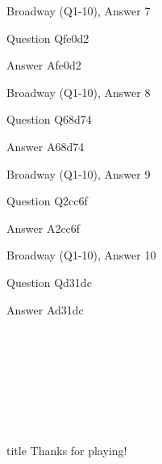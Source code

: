 \documentclass[11pt]{beamer}
\begin{document}
\begin{frame}[t]{Broadway (Q1-10), Answer 7}
\vspace{2em}
\begin{block}{Question}
Qfe0d2
\end{block}
\pause{}
\begin{block}{Answer}
Afe0d2
\end{block}
\end{frame}
    

\begin{frame}[t]{Broadway (Q1-10), Answer 8}
\vspace{2em}
\begin{block}{Question}
Q68d74
\end{block}
\pause{}
\begin{block}{Answer}
A68d74
\end{block}
\end{frame}
    

\begin{frame}[t]{Broadway (Q1-10), Answer 9}
\vspace{2em}
\begin{block}{Question}
Q2cc6f
\end{block}
\pause{}
\begin{block}{Answer}
A2cc6f
\end{block}
\end{frame}
    

\begin{frame}[t]{Broadway (Q1-10), Answer 10}
\vspace{2em}
\begin{block}{Question}
Qd31dc
\end{block}
\pause{}
\begin{block}{Answer}
Ad31dc
\end{block}
\end{frame}
    

\section*{\ }
\subsection*{\ }
\begingroup{}
\begin{frame}
\vfill{}
\centering{}
\begin{beamercolorbox}[sep=8pt,center,shadow=true,rounded=true]{title}
Thanks for playing!\par%
\end{beamercolorbox}
\vfill{}
\end{frame}
\endgroup{}
\end{document}

